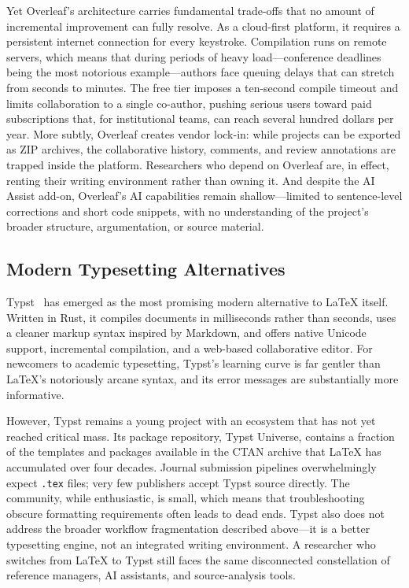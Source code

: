 \documentclass[a4paper,11pt]{article}
\begin{document}
Yet Overleaf's architecture carries fundamental trade-offs that no amount of incremental improvement can fully resolve. As a cloud-first platform, it requires a persistent internet connection for every keystroke. Compilation runs on remote servers, which means that during periods of heavy load---conference deadlines being the most notorious example---authors face queuing delays that can stretch from seconds to minutes. The free tier imposes a ten-second compile timeout and limits collaboration to a single co-author, pushing serious users toward paid subscriptions that, for institutional teams, can reach several hundred dollars per year. More subtly, Overleaf creates vendor lock-in: while projects can be exported as ZIP archives, the collaborative history, comments, and review annotations are trapped inside the platform. Researchers who depend on Overleaf are, in effect, renting their writing environment rather than owning it. And despite the AI Assist add-on, Overleaf's AI capabilities remain shallow---limited to sentence-level corrections and short code snippets, with no understanding of the project's broader structure, argumentation, or source material.

\subsection{Modern Typesetting Alternatives}

Typst~\cite{Typst} has emerged as the most promising modern alternative to LaTeX itself. Written in Rust, it compiles documents in milliseconds rather than seconds, uses a cleaner markup syntax inspired by Markdown, and offers native Unicode support, incremental compilation, and a web-based collaborative editor. For newcomers to academic typesetting, Typst's learning curve is far gentler than LaTeX's notoriously arcane syntax, and its error messages are substantially more informative.

However, Typst remains a young project with an ecosystem that has not yet reached critical mass. Its package repository, Typst Universe, contains a fraction of the templates and packages available in the CTAN archive that LaTeX has accumulated over four decades. Journal submission pipelines overwhelmingly expect \texttt{.tex} files; very few publishers accept Typst source directly. The community, while enthusiastic, is small, which means that troubleshooting obscure formatting requirements often leads to dead ends. Typst also does not address the broader workflow fragmentation described above---it is a better typesetting engine, not an integrated writing environment. A researcher who switches from LaTeX to Typst still faces the same disconnected constellation of reference managers, AI assistants, and source-analysis tools.
\end{document}
